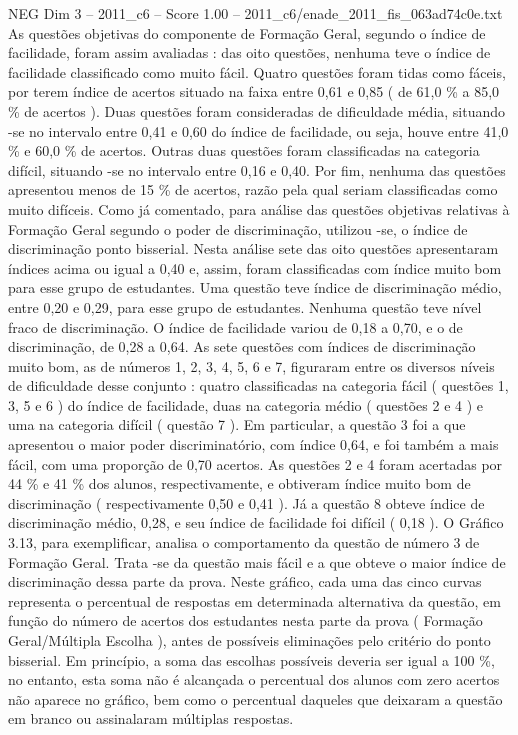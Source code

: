 \begin{textsample}{NEG Dim 3 – 2011\_c6 – Score 1.00 – 2011\_c6/enade\_2011\_fis\_063ad74c0e.txt}
As questões objetivas do componente de Formação Geral, segundo o índice de facilidade, foram assim avaliadas : das oito questões, nenhuma teve o índice de facilidade classificado como muito fácil.
Quatro questões foram tidas como fáceis, por terem índice de acertos situado na faixa entre 0,61 e 0,85 ( de 61,0 \% a 85,0 \% de acertos ).
Duas questões foram consideradas de dificuldade média, situando -se no intervalo entre 0,41 e 0,60 do índice de facilidade, ou seja, houve entre 41,0 \% e 60,0 \% de acertos.
Outras duas questões foram classificadas na categoria difícil, situando -se no intervalo entre 0,16 e 0,40.
Por fim, nenhuma das questões apresentou menos de 15 \% de acertos, razão pela qual seriam classificadas como muito difíceis.
Como já comentado, para análise das questões objetivas relativas à Formação Geral segundo o poder de discriminação, utilizou -se, o índice de discriminação ponto bisserial.
Nesta análise sete das oito questões apresentaram índices acima ou igual a 0,40 e, assim, foram classificadas com índice muito bom para esse grupo de estudantes.
Uma questão teve índice de discriminação médio, entre 0,20 e 0,29, para esse grupo de estudantes.
Nenhuma questão teve nível fraco de discriminação.
O índice de facilidade variou de 0,18 a 0,70, e o de discriminação, de 0,28 a 0,64.
As sete questões com índices de discriminação muito bom, as de números 1, 2, 3, 4, 5, 6 e 7, figuraram entre os diversos níveis de dificuldade desse conjunto : quatro classificadas na categoria fácil ( questões 1, 3, 5 e 6 ) do índice de facilidade, duas na categoria médio ( questões 2 e 4 ) e uma na categoria difícil ( questão 7 ).
Em particular, a questão 3 foi a que apresentou o maior poder discriminatório, com índice 0,64, e foi também a mais fácil, com uma proporção de 0,70 acertos.
As questões 2 e 4 foram acertadas por 44 \% e 41 \% dos alunos, respectivamente, e obtiveram índice muito bom de discriminação ( respectivamente 0,50 e 0,41 ).
Já a questão 8 obteve índice de discriminação médio, 0,28, e seu índice de facilidade foi difícil ( 0,18 ).
O Gráfico 3.13, para exemplificar, analisa o comportamento da questão de número 3 de Formação Geral.
Trata -se da questão mais fácil e a que obteve o maior índice de discriminação dessa parte da prova.
Neste gráfico, cada uma das cinco curvas representa o percentual de respostas em determinada alternativa da questão, em função do número de acertos dos estudantes nesta parte da prova ( Formação Geral/Múltipla Escolha ), antes de possíveis eliminações pelo critério do ponto bisserial.
Em princípio, a soma das escolhas possíveis deveria ser igual a 100 \%, no entanto, esta soma não é alcançada o percentual dos alunos com zero acertos não aparece no gráfico, bem como o percentual daqueles que deixaram a questão em branco ou assinalaram múltiplas respostas.

\end{textsample}
